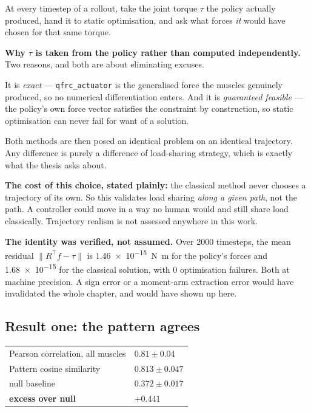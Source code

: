 At every timestep of a rollout, take the joint torque $\tau$ the policy actually
produced, hand it to static optimisation, and ask what forces \emph{it} would
have chosen for that same torque.

\begin{why}
\textbf{Why $\tau$ is taken from the policy rather than computed independently.}
Two reasons, and both are about eliminating excuses.

It is \emph{exact} --- \texttt{qfrc\_actuator} is the generalised force the
muscles genuinely produced, so no numerical differentiation enters. And it is
\emph{guaranteed feasible} --- the policy's own force vector satisfies the
constraint by construction, so static optimisation can never fail for want of a
solution.

Both methods are then posed an identical problem on an identical trajectory. Any
difference is purely a difference of load-sharing strategy, which is exactly what
the thesis asks about.

\textbf{The cost of this choice, stated plainly:} the classical method never
chooses a trajectory of its own. So this validates load sharing \emph{along a
given path}, not the path. A controller could move in a way no human would and
still share load classically. Trajectory realism is not assessed anywhere in this
work.
\end{why}

\textbf{The identity was verified, not assumed.} Over 2000 timesteps, the mean
residual $\|R^\top f - \tau\|$ is \SI{1.46e-15}{\newton\meter} for the policy's
forces and \SI{1.68e-15}{} for the classical solution, with 0 optimisation
failures. Both at machine precision. A sign error or a moment-arm extraction
error would have invalidated the whole chapter, and would have shown up here.

\subsection{Result one: the pattern agrees}

\begin{center}
\begin{tabular}{@{} L{8.2cm} R{4.0cm} @{}}
\toprule
Pearson correlation, all muscles & $\mathbf{0.81 \pm 0.04}$ \\
Pattern cosine similarity & $0.813 \pm 0.047$ \\
\quad null baseline & $0.372 \pm 0.017$ \\
\quad \textbf{excess over null} & $\mathbf{+0.441}$ \\
\bottomrule
\end{tabular}
\end{center}

